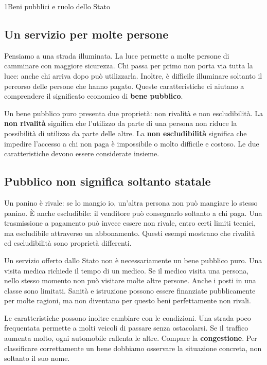 \begin{lettura}{1}{Beni pubblici e ruolo dello Stato}


\subsection*{Un servizio per molte persone}
Pensiamo a una strada illuminata. La luce permette a molte persone di camminare con maggiore sicurezza. Chi passa per primo non porta via tutta la luce: anche chi arriva dopo può utilizzarla. Inoltre, è difficile illuminare soltanto il percorso delle persone che hanno pagato. Queste caratteristiche ci aiutano a comprendere il significato economico di \textbf{bene pubblico}.

Un bene pubblico puro presenta due proprietà: non rivalità e non escludibilità. La \textbf{non rivalità} significa che l'utilizzo da parte di una persona non riduce la possibilità di utilizzo da parte delle altre. La \textbf{non escludibilità} significa che impedire l'accesso a chi non paga è impossibile o molto difficile e costoso. Le due caratteristiche devono essere considerate insieme.

\subsection*{Pubblico non significa soltanto statale}
Un panino è rivale: se lo mangio io, un'altra persona non può mangiare lo stesso panino. È anche escludibile: il venditore può consegnarlo soltanto a chi paga. Una trasmissione a pagamento può invece essere non rivale, entro certi limiti tecnici, ma escludibile attraverso un abbonamento. Questi esempi mostrano che rivalità ed escludibilità sono proprietà differenti.

Un servizio offerto dallo Stato non è necessariamente un bene pubblico puro. Una visita medica richiede il tempo di un medico. Se il medico visita una persona, nello stesso momento non può visitare molte altre persone. Anche i posti in una classe sono limitati. Sanità e istruzione possono essere finanziate pubblicamente per molte ragioni, ma non diventano per questo beni perfettamente non rivali.

Le caratteristiche possono inoltre cambiare con le condizioni. Una strada poco frequentata permette a molti veicoli di passare senza ostacolarsi. Se il traffico aumenta molto, ogni automobile rallenta le altre. Compare la \textbf{congestione}. Per classificare correttamente un bene dobbiamo osservare la situazione concreta, non soltanto il suo nome.


\end{lettura}
